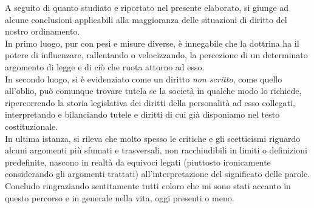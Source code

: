 A seguito di quanto studiato e riportato nel presente elaborato, si giunge ad alcune conclusioni applicabili alla maggioranza delle situazioni di diritto del nostro ordinamento.
\\In primo luogo, pur con pesi e misure diverse, è innegabile che la dottrina ha il potere di influenzare, rallentando o velocizzando, la percezione di un determinato argomento di legge e di ciò che ruota attorno ad esso.
\\In secondo luogo, si è evidenziato come un diritto \textit{non scritto}, come quello all'oblio, può comunque trovare tutela se la società in qualche modo lo richiede, ripercorrendo la storia legislativa dei diritti della personalità ad esso collegati, interpretando e bilanciando tutele e diritti di cui già disponiamo nel testo costituzionale.
\\In ultima istanza, si rileva che molto spesso le critiche e gli scetticismi riguardo alcuni argomenti più sfumati e trasversali, non racchiudibili in limiti o definizioni predefinite, nascono in realtà da equivoci legati (piuttosto ironicamente considerando gli argomenti trattati) all'interpretazione del significato delle parole.
\\Concludo ringraziando sentitamente tutti coloro che mi sono stati accanto in questo percorso e in generale nella vita, oggi presenti o meno.

  
